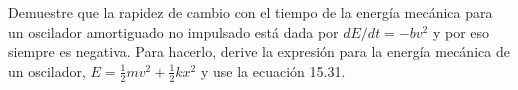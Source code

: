 \item Demuestre que la rapidez de cambio con el tiempo de la energía mecánica para un oscilador amortiguado no impulsado está dada por $dE/dt = -bv^2$ y por eso siempre es negativa. Para hacerlo, derive la expresión para la energía mecánica de un oscilador, $E = \frac{1}{2}mv^2 + \frac{1}{2}kx^2$ y use la ecuación 15.31.